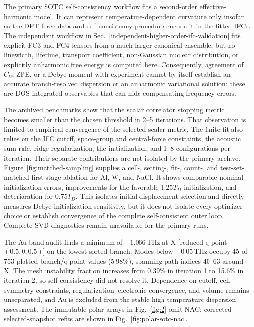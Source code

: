 \documentclass[aps,prb,reprint,amsmath,amssymb,floatfix]{revtex4-2}
\begin{document}
\color{revisionblue}
The primary SOTC self-consistency workflow fits a second-order
effective-harmonic model. It can represent temperature-dependent curvature
only insofar as the DFT force data and self-consistency procedure encode it in
the fitted IFCs. The independent workflow in
Sec.~\ref{independent-higher-order-ifc-validation} fits explicit FC3 and FC4 tensors from a much larger canonical ensemble, but no linewidth,
lifetime, transport coefficient, non-Gaussian nuclear distribution, or
explicitly anharmonic free energy is computed here. Consequently, agreement
of \(C_V\), ZPE, or a Debye moment with experiment cannot by itself establish
an accurate branch-resolved dispersion or an anharmonic variational solution:
these are DOS-integrated observables that can hide compensating frequency
errors.
\color{black}

\color{revisionblue}
The archived benchmarks show that the scalar correlator stopping metric becomes
smaller than the chosen threshold in 2--5 iterations. That observation is
limited to empirical convergence of the selected scalar metric. The
finite fit also relies on the IFC cutoff, space-group and central-force
constraints, the acoustic sum rule, ridge regularization, the initialization,
and 1--8 configurations per iteration. Their separate contributions are not
isolated by the primary archive. Figure~\ref{fig:matched-sampling} supplies a
cell-, setting-, fit-, count-, and test-set-matched first-stage ablation for Al,
W, and NaCl. It shows comparable nominal-initialization errors, improvements
for the favorable \(1.25T_D\) initialization, and deterioration for
\(0.75T_D\). This isolates initial displacement selection and directly measures
Debye-initialization sensitivity, but it does not isolate every optimizer
choice or establish convergence of the complete self-consistent outer loop.
Complete SVD diagnostics remain unavailable for the primary runs.
\color{black}

\color{revisionblue}
The Au band audit finds a minimum of \(-1.066\)\,THz at X
[reduced q point \((0.5,0,0.5)\)] on the lowest sorted branch. Modes below
\(-0.05\)\,THz occupy 45 of 753 plotted branch/q-point values (5.98\%),
spanning path indices 40--63 around X. The mesh instability fraction increases
from 0.39\% in iteration 1 to 15.6\% in iteration 2, so self-consistency did
not resolve it. Dependence on cutoff, cell, symmetry constraints,
regularization, electronic convergence, and volume remains unseparated, and Au
is excluded from the stable high-temperature dispersion assessment. The
immutable polar arrays in Fig.~\ref{fig:2} omit NAC; corrected
selected-snapshot refits are shown in Fig.~\ref{fig:polar-sotc-nac}.
\color{black}
\end{document}
